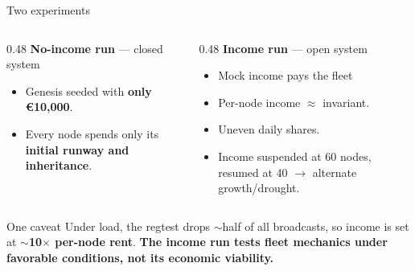 {
\begin{frame}{Two experiments}
  \small
  \begin{columns}[T, onlytextwidth]
    \begin{column}{0.48\textwidth}
    \smallskip
      \textbf{No-income run} --- closed system
      \begin{itemize}
        \item Genesis seeded with  \textbf{only €10,000}.
        \item Every node spends only its \textbf{initial runway and inheritance}.
      \end{itemize}
    \end{column}
    \begin{column}{0.48\textwidth}
    \smallskip
      \textbf{Income run} --- open system
      \begin{itemize}
        \item Mock income pays the fleet
        \item Per-node income \(\approx\)
          invariant.
        \item Uneven daily shares.
        \item Income suspended at 60 nodes, resumed at 40 \(\to\) alternate growth/drought.
      \end{itemize}
    \end{column}
  \end{columns}
 \smallskip
 \smallskip
 \smallskip
  \vspace{-1ex}
  \begin{alertblock}{One caveat}
    Under load, the regtest drops \(\sim\)half of all broadcasts, so income
    is set at \textbf{\(\sim\)10\(\times\) per-node rent}. \textbf{The income run tests fleet mechanics under favorable
    conditions, not its economic viability.}
  \end{alertblock}
\end{frame}
}
